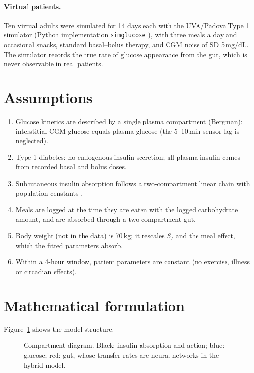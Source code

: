 \documentclass[11pt,a4paper]{article}
\begin{document}
\paragraph{Virtual patients.} Ten virtual adults were simulated for 14 days each with the UVA/Padova Type 1 simulator \cite{dallaman2007,kovatchev2009} (Python implementation \texttt{simglucose} \cite{simglucose}), with three meals a day and occasional snacks, standard basal--bolus therapy, and CGM noise of SD 5\,mg/dL. The simulator records the true rate of glucose appearance from the gut, which is never observable in real patients.

\section{Assumptions}
\begin{enumerate}
  \item Glucose kinetics are described by a single plasma compartment (Bergman); interstitial CGM glucose equals plasma glucose (the 5--10\,min sensor lag is neglected).
  \item Type 1 diabetes: no endogenous insulin secretion; all plasma insulin comes from recorded basal and bolus doses.
  \item Subcutaneous insulin absorption follows a two-compartment linear chain with population constants \cite{hovorka2004}.
  \item Meals are logged at the time they are eaten with the logged carbohydrate amount, and are absorbed through a two-compartment gut.
  \item Body weight (not in the data) is 70\,kg; it rescales $S_I$ and the meal effect, which the fitted parameters absorb.
  \item Within a 4-hour window, patient parameters are constant (no exercise, illness or circadian effects).
\end{enumerate}

\section{Mathematical formulation}
Figure~\ref{fig:diagram} shows the model structure.
\begin{figure}[H]
\centering
\resizebox{\textwidth}{!}{}
\caption{Compartment diagram. Black: insulin absorption and action; blue: glucose; red: gut, whose transfer rates are neural networks in the hybrid model.}
\label{fig:diagram}
\end{figure}
\end{document}
